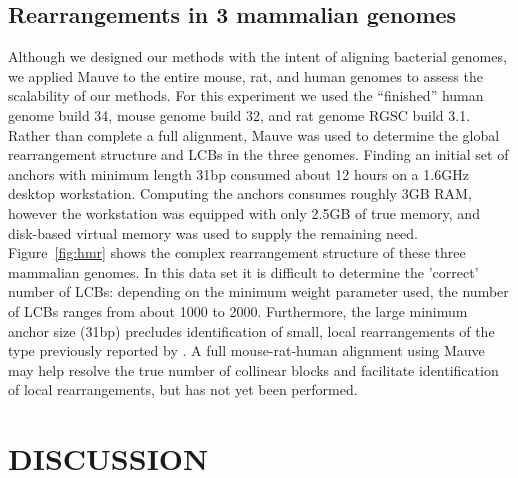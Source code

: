\documentclass[titlepage,11pt]{article}
\begin{document}
\subsection*{Rearrangements in 3 mammalian genomes}
Although we designed our methods with the intent of aligning bacterial genomes,
we applied Mauve to the entire mouse, rat, and human genomes to assess the
scalability of our methods.  For this experiment we used the ``finished''
human genome build 34, mouse genome build 32, and rat genome RGSC build
3.1.  Rather than complete a full alignment, Mauve was used to determine the
global rearrangement structure and LCBs in the three genomes.  Finding an
initial set
of anchors with minimum length 31bp consumed about 12 hours on a 1.6GHz
desktop workstation.  Computing the anchors consumes roughly 3GB RAM, however
the workstation was equipped with only 2.5GB of true memory, and disk-based virtual memory
was used to supply the remaining need.  Figure~\ref{fig:hmr} shows the
complex rearrangement structure of these three mammalian genomes. In this data
set it is difficult to determine the 'correct' number of LCBs: depending on the
minimum weight parameter used, the number of LCBs ranges from about 1000 to
2000.  Furthermore, the large minimum anchor size (31bp) precludes
identification of small, local rearrangements of the type previously reported by
\cite{slagan}. A full mouse-rat-human alignment using Mauve may help resolve the
true number of collinear blocks and facilitate identification of local
rearrangements, but has not yet been performed.


\section*{ DISCUSSION }

\end{document}
